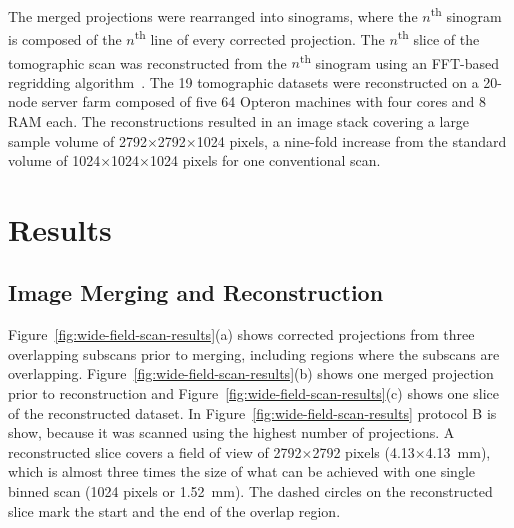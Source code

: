 \documentclass[preprint,s]{iucr}
\begin{document}
The merged projections were rearranged into sinograms, where the $n$\textsuperscript{th} sinogram is composed of the $n$\textsuperscript{th} line of every corrected projection. The $n$\textsuperscript{th} slice of the tomographic scan was reconstructed from the $n$\textsuperscript{th} sinogram using an FFT-based regridding algorithm~\cite{Dowd1999}. The 19 tomographic datasets were reconstructed on a 20-node server farm composed of five \SI{64}{\bit} Opteron machines with four cores and \SI{8}{\giga\byte} RAM each. The reconstructions resulted in an image stack covering a large sample volume of 2792$\times$2792$\times$1024 pixels, a nine-fold increase from the standard volume of 1024$\times$1024$\times$1024 pixels for one conventional scan.
\section{Results}\label{sec:Results}
\subsection{Image Merging and Reconstruction}\label{sec:Image Merging and Reconstruction}
Figure~\ref{fig:wide-field-scan-results}(a) shows corrected projections from three overlapping subscans prior to merging, including regions where the subscans are overlapping. Figure~\ref{fig:wide-field-scan-results}(b) shows one merged projection prior to reconstruction and Figure~\ref{fig:wide-field-scan-results}(c) shows one slice of the reconstructed dataset. In Figure~\ref{fig:wide-field-scan-results} protocol B is show, because it was scanned using the highest number of projections. A reconstructed slice covers a field of view of 2792$\times$2792 pixels (4.13$\times$\SI{4.13}{\milli\meter}), which is almost three times the size of what can be achieved with one single binned scan (1024 pixels or \SI{1.52}{\milli\meter}). %
The dashed circles on the reconstructed slice mark the start and the end of the overlap region.
\end{document}
